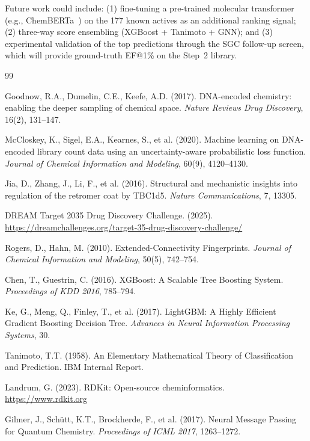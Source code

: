 \documentclass[10pt, letterpaper]{article}
\begin{document}
Future work could include: (1) fine-tuning a pre-trained molecular transformer (e.g., ChemBERTa~\cite{Chithrananda2020}) on the 177 known actives as an additional ranking signal; (2) three-way score ensembling (XGBoost + Tanimoto + GNN); and (3) experimental validation of the top predictions through the SGC follow-up screen, which will provide ground-truth EF@1\% on the Step~2 library.


\begin{thebibliography}{99}

Goodnow, R.A., Dumelin, C.E., Keefe, A.D. (2017).
DNA-encoded chemistry: enabling the deeper sampling of chemical space.
\textit{Nature Reviews Drug Discovery}, 16(2), 131--147.

McCloskey, K., Sigel, E.A., Kearnes, S., et al. (2020).
Machine learning on DNA-encoded library count data using an uncertainty-aware probabilistic loss function.
\textit{Journal of Chemical Information and Modeling}, 60(9), 4120--4130.

Jia, D., Zhang, J., Li, F., et al. (2016).
Structural and mechanistic insights into regulation of the retromer coat by TBC1d5.
\textit{Nature Communications}, 7, 13305.

DREAM Target 2035 Drug Discovery Challenge. (2025).
\url{https://dreamchallenges.org/target-35-drug-discovery-challenge/}

Rogers, D., Hahn, M. (2010).
Extended-Connectivity Fingerprints.
\textit{Journal of Chemical Information and Modeling}, 50(5), 742--754.

Chen, T., Guestrin, C. (2016).
XGBoost: A Scalable Tree Boosting System.
\textit{Proceedings of KDD 2016}, 785--794.

Ke, G., Meng, Q., Finley, T., et al. (2017).
LightGBM: A Highly Efficient Gradient Boosting Decision Tree.
\textit{Advances in Neural Information Processing Systems}, 30.

Tanimoto, T.T. (1958).
An Elementary Mathematical Theory of Classification and Prediction.
IBM Internal Report.

Landrum, G. (2023).
RDKit: Open-source cheminformatics. \url{https://www.rdkit.org}

Gilmer, J., Schütt, K.T., Brockherde, F., et al. (2017).
Neural Message Passing for Quantum Chemistry.
\textit{Proceedings of ICML 2017}, 1263--1272.


\end{thebibliography}
\end{document}
